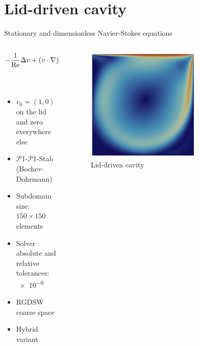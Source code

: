 \section{Lid-driven cavity}
\begin{frame}{Stationary and dimensionless Navier-Stokes equations}
	\vspace{-5mm}
	\begin{columns}
		\begin{column}{0.6\textwidth}%
			\begin{align*}
				-\frac{1}{\rm Re} \Delta v + (v \cdot \nabla)v + \nabla p & = 0 \;   & {\rm in}\; \Omega           \\
				{\rm div}(v)                                              & = 0 \;   & {\rm in} \; \Omega          \\
				v                                                         & = v_0 \; & {\rm on} \; \partial \Omega
			\end{align*}
			\vspace{-4mm}
			\begin{itemize}
				\item $v_0=(1,0)$ on the lid and zero everywhere else
				\item $\mathcal{P}$1-$\mathcal{P}$1-Stab (Bochev-Dohrmann) \footnotemark{}
				\item Subdomain size: $150\times 150$ elements
				\item Solver absolute and relative tolerances: \num{e-6}
				\item RGDSW coarse space
				\item Hybrid variant
			\end{itemize}
		\end{column}
		\begin{column}{0.4\textwidth}
			\begin{figure}
				\centering
				\includegraphics[width=0.7\textwidth]{images/ldc.png}
				\caption{Lid-driven cavity}
			\end{figure}
		\end{column}
	\end{columns}
\end{frame}

